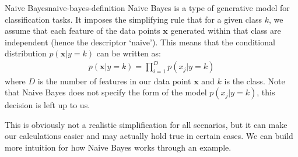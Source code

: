\begin{definition}{Naive Bayes}{naive-bayes-definition}
	Naive Bayes is a type of generative model for classification tasks. It imposes the simplifying rule that for a given class $k$, we assume that each feature of the data points $\textbf{x}$ generated within that class are independent (hence the descriptor `naive'). This means that the conditional distribution $p(\textbf{x} | y = k)$ can be written as:
	\begin{align*}
		p(\textbf{x} | y = k) = \prod_{i = 1}^{D} p(x_{j} | y = k)
	\end{align*}
	where $D$ is the number of features in our data point $\textbf{x}$ and $k$ is the class. Note that Naive Bayes does not specify the form of the model $p(x_{j} | y = k)$, this decision is left up to us.
\end{definition}
This is obviously not a realistic simplification for all scenarios, but it can make our calculations easier and may actually hold true in certain cases. We can build more intuition for how Naive Bayes works through an example.

